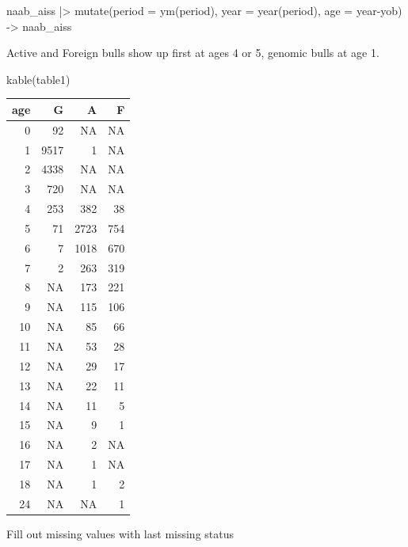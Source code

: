 \documentclass[
]{article}
\newenvironment{Shaded}{\begin{snugshade}}{\end{snugshade}}
\newcommand{\AttributeTok}[1]{\textcolor[rgb]{0.77,0.63,0.00}{#1}}
\newcommand{\FunctionTok}[1]{\textcolor[rgb]{0.00,0.00,0.00}{#1}}
\newcommand{\NormalTok}[1]{#1}
\newcommand{\OtherTok}[1]{\textcolor[rgb]{0.56,0.35,0.01}{#1}}
\newcommand{\SpecialCharTok}[1]{\textcolor[rgb]{0.00,0.00,0.00}{#1}}
\begin{document}
\begin{Shaded}
\begin{Highlighting}[]
\NormalTok{naab\_aiss }\SpecialCharTok{|\textgreater{}} 
  \FunctionTok{mutate}\NormalTok{(}\AttributeTok{period =} \FunctionTok{ym}\NormalTok{(period),}
         \AttributeTok{year =} \FunctionTok{year}\NormalTok{(period),}
         \AttributeTok{age =}\NormalTok{ year}\SpecialCharTok{{-}}\NormalTok{yob) }\OtherTok{{-}\textgreater{}}
\NormalTok{  naab\_aiss}
\end{Highlighting}
\end{Shaded}

Active and Foreign bulls show up first at ages 4 or 5, genomic bulls at
age 1.

\begin{Shaded}
\begin{Highlighting}[]
\FunctionTok{kable}\NormalTok{(table1)}
\end{Highlighting}
\end{Shaded}

\begin{longtable}[]{@{}rrrr@{}}
\toprule()
age & G & A & F \\
\midrule()
\endhead
0 & 92 & NA & NA \\
1 & 9517 & 1 & NA \\
2 & 4338 & NA & NA \\
3 & 720 & NA & NA \\
4 & 253 & 382 & 38 \\
5 & 71 & 2723 & 754 \\
6 & 7 & 1018 & 670 \\
7 & 2 & 263 & 319 \\
8 & NA & 173 & 221 \\
9 & NA & 115 & 106 \\
10 & NA & 85 & 66 \\
11 & NA & 53 & 28 \\
12 & NA & 29 & 17 \\
13 & NA & 22 & 11 \\
14 & NA & 11 & 5 \\
15 & NA & 9 & 1 \\
16 & NA & 2 & NA \\
17 & NA & 1 & NA \\
18 & NA & 1 & 2 \\
24 & NA & NA & 1 \\
\bottomrule()
\end{longtable}

Fill out missing values with last missing status
\end{document}
